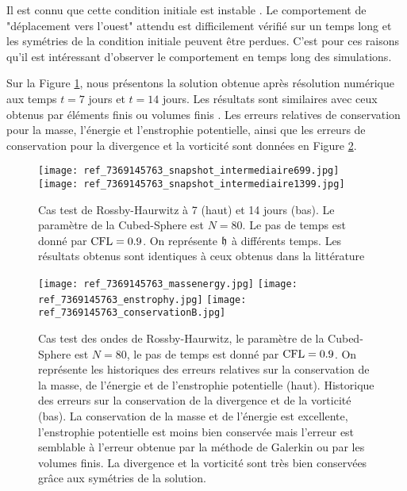 Il est connu  que cette condition initiale est instable \cite{Thuburn2000}. Le comportement de "déplacement vers l'ouest" attendu est difficilement vérifié sur un temps long et les symétries de la condition initiale peuvent être perdues. C'est pour ces raisons qu'il est intéressant d'observer le comportement en temps long des simulations.

Sur la Figure \ref{fig: rossby 714}, nous présentons la solution obtenue après résolution numérique aux temps $t=7$ jours et $t=14$ jours. Les résultats sont similaires avec ceux obtenus par éléments finis ou volumes finis \cite{Chen2008, Galewsky2004}. Les erreurs relatives de conservation pour la masse, l'énergie et l'enstrophie potentielle, ainsi que les erreurs de conservation pour la divergence et la vorticité sont données en Figure \ref{fig: rossby conservation}.

\begin{figure}[htbp]
\begin{center}
\texttt{[image: ref\_7369145763\_snapshot\_intermediaire699.jpg]}
\texttt{[image: ref\_7369145763\_snapshot\_intermediaire1399.jpg]}
\end{center}
\caption{Cas test de Rossby-Haurwitz à 7 (haut) et 14 jours (bas). Le paramètre de la Cubed-Sphere est $N=80$. Le pas de temps est donné par $\text{CFL}=0.9$. On représente $\mathfrak{h}$ à différents temps. Les résultats obtenus sont identiques à ceux obtenus dans la littérature \cite{Chen2008, Ullrich2011}}
\label{fig: rossby 714}
\end{figure}

\begin{figure}[htbp]
\begin{center}
\texttt{[image: ref\_7369145763\_massenergy.jpg]}
\texttt{[image: ref\_7369145763\_enstrophy.jpg]}
\texttt{[image: ref\_7369145763\_conservationB.jpg]}
\end{center}
\caption{Cas test des ondes de Rossby-Haurwitz, le paramètre de la Cubed-Sphere est $N=80$, le pas de temps est donné par $\text{CFL}=0.9$. On représente les historiques des erreurs relatives sur la conservation de la masse, de l'énergie et de l'enstrophie potentielle (haut). Historique des erreurs sur la conservation de la divergence et de la vorticité (bas). La conservation de la masse et de l'énergie est excellente, l'enstrophie potentielle est moins bien conservée mais l'erreur est semblable à l'erreur obtenue par la méthode de Galerkin ou par les volumes finis. La divergence et la vorticité sont très bien conservées grâce aux symétries de la solution.}
\label{fig: rossby conservation}
\end{figure}

